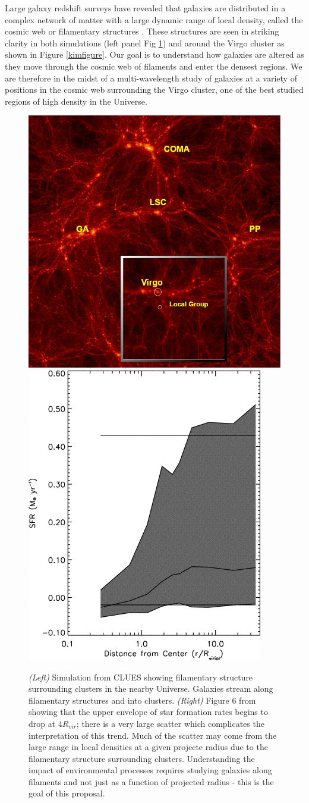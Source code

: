 \documentclass[11pt, preprint]{aastex}
\begin{document}
Large galaxy redshift surveys have revealed that galaxies are distributed in a complex network
of matter with a large dynamic range of local density, called the
cosmic web or filamentary structures \citep{kitaura09, darvish14}.
These structures are seen in striking clarity in both simulations
(left panel Fig \ref{fig1}) and around the
Virgo cluster as shown in Figure \ref{kimfigure}.  Our goal is to understand how 
galaxies are altered as they move through the cosmic web of filaments and enter the
densest regions.  We are therefore in the midst of a
multi-wavelength study of galaxies at a variety of positions in the
cosmic web surrounding the Virgo cluster, one of the best studied
regions of high density in the Universe.  

 \begin{figure}[h]
   \centering
 \includegraphics[width=.48\textwidth]{CLUES-DM.png}
\includegraphics[width=.39\textwidth]{gomez2003-fg6a.png}
   \caption{\small  {\it (Left) } Simulation from CLUES showing
     filamentary structure surrounding clusters in the nearby
     Universe.  Galaxies stream along filamentary structures and into clusters.
{\it (Right)}  Figure 6 from \citet{gomez03} showing that the upper
envelope of star formation rates begins to drop at $4R_{vir}$;  there is a very
large scatter which complicates the interpretation of this trend.   Much
of the scatter may come from the large range in local densities at a given
projecte radius due to the filamentary structure surrounding clusters.
Understanding the impact of environmental processes requires studying galaxies along
filaments and not just as a function of projected radius - this is the goal of this proposal.}
     \label{fig1}
 \end{figure}
\end{document}
